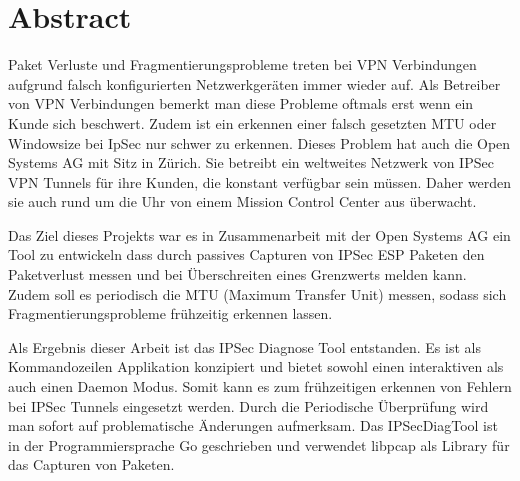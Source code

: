 
\chapter*{Abstract}

Paket Verluste und Fragmentierungsprobleme treten bei VPN Verbindungen aufgrund falsch konfigurierten Netzwerkgeräten immer wieder auf. Als Betreiber von VPN Verbindungen bemerkt man diese Probleme oftmals erst wenn ein Kunde sich beschwert.
Zudem ist ein erkennen einer falsch gesetzten MTU oder Windowsize bei IpSec nur schwer zu erkennen. Dieses Problem hat auch die Open Systems AG mit Sitz in Zürich. Sie betreibt ein weltweites Netzwerk von IPSec VPN Tunnels für ihre Kunden, die konstant verfügbar sein müssen. Daher werden sie auch rund um die Uhr von einem Mission Control Center aus überwacht.

Das Ziel dieses Projekts war es in Zusammenarbeit mit der Open Systems AG ein Tool zu entwickeln dass durch passives Capturen von IPSec ESP Paketen den Paketverlust messen und bei Überschreiten eines Grenzwerts melden kann. Zudem soll es periodisch die MTU (Maximum Transfer Unit) messen, sodass sich Fragmentierungsprobleme frühzeitig erkennen lassen.

Als Ergebnis dieser Arbeit ist das IPSec Diagnose Tool entstanden. Es ist als Kommandozeilen Applikation konzipiert und bietet sowohl einen interaktiven als auch einen Daemon Modus. 
Somit kann es zum frühzeitigen erkennen von Fehlern bei IPSec Tunnels eingesetzt werden. Durch die Periodische Überprüfung wird man sofort auf problematische Änderungen aufmerksam.
Das IPSecDiagTool ist in der Programmiersprache Go geschrieben und verwendet libpcap als Library für das Capturen von Paketen. 